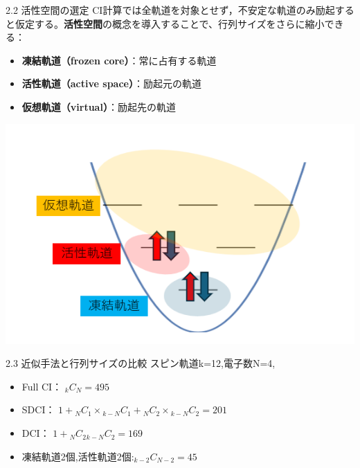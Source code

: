 \documentclass{beamer}
\begin{document}
  
\begin{frame}{2.2 活性空間の選定}
  CI計算では全軌道を対象とせず，不安定な軌道のみ励起すると仮定する。\textbf{活性空間}の概念を導入することで、行列サイズをさらに縮小できる：
  
  \vspace{1em}
  \begin{itemize}
    \item \textbf{凍結軌道（frozen core）}：常に占有する軌道
    \item \textbf{活性軌道（active space）}：励起元の軌道
    \item \textbf{仮想軌道（virtual）}：励起先の軌道
  \end{itemize}
  \begin{center}
    \includegraphics[width=0.75\linewidth]{imeges/kidou.png}
    \end{center}

  \end{frame}

    \begin{frame}{2.3 近似手法と行列サイズの比較}
      スピン軌道k=12,電子数N=4, 
      \begin{itemize}
        \item Full CI： ${}_k C_N=495$
        \item SDCI：    $1 + {}_N C_1 \times {}_{k-N} C_1 + {}_N C_2 \times {}_{k-N} C_2=201$
        \item DCI：     $1 + {}_N C_2 {}_{k-N} C_2=169$
        \item 凍結軌道2個,活性軌道2個:${}_{k-2} C_{N-2}=45$ 
      \end{itemize}




      \end{frame}   
\end{document}

